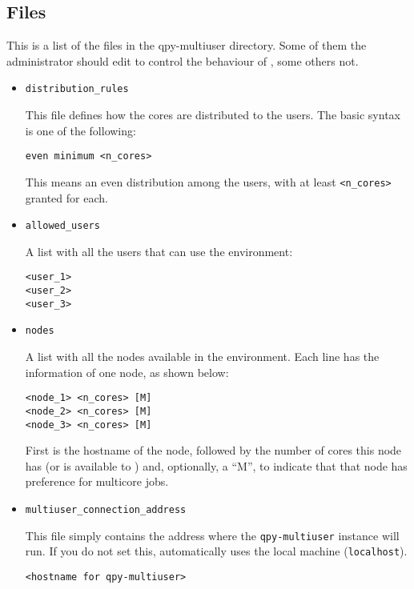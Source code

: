 \documentclass[a4paper,12pt]{article}
\begin{document}
\subsection{Files}\label{sec:admin_files}

This is a list of the files in the qpy-multiuser directory.
Some of them the administrator should edit to control the behaviour of \qpy{}, some others not.

\begin{itemize}

\item \texttt{distribution\_rules}

  This file defines how the cores are distributed to the users.
  The basic syntax is one of the following:

  \begin{lstlisting}[style=FileStyle]
even minimum <n_cores>
  \end{lstlisting}

This means an even distribution among the users, with at least \texttt{<n\_cores>} granted for each.

\item \texttt{allowed\_users}

  A list with all the users that can use the \qpy{} environment:

  \begin{lstlisting}[style=FileStyle]
<user_1>
<user_2>
<user_3>
  \end{lstlisting}

\item \texttt{nodes}

  A list with all the nodes available in the \qpy{} environment.
  Each line has the information of one node, as shown below:

  \begin{lstlisting}[style=FileStyle]
<node_1> <n_cores> [M]
<node_2> <n_cores> [M]
<node_3> <n_cores> [M]
  \end{lstlisting}

  First is the hostname of the node, followed by the number of cores this node has (or is available to \qpy{}) and, optionally, a ``M'', to indicate that that node has preference for multicore jobs.
  
\item \texttt{multiuser\_connection\_address}

  This file simply contains the address where the \texttt{qpy-multiuser} instance will run.
  If you do not set this, \qpy{} automatically uses the local machine (\texttt{localhost}).
  \begin{lstlisting}[style=FileStyle]
<hostname for qpy-multiuser>
  \end{lstlisting}
  

\end{itemize}
\end{document}
